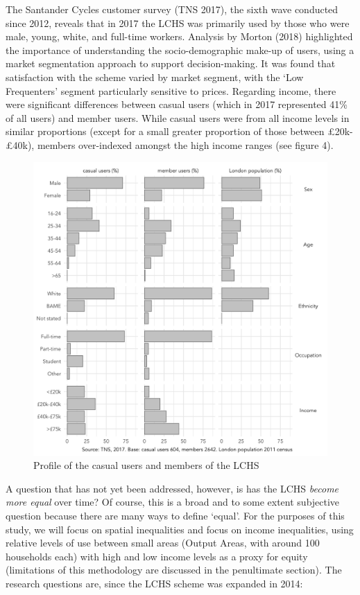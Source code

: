 \documentclass[]{article}
\begin{document}
The Santander Cycles customer survey (TNS 2017), the sixth wave conducted since 2012, reveals that in 2017 the LCHS was primarily used by those who were male, young, white, and full-time workers.
Analysis by Morton (2018) highlighted the importance of understanding the socio-demographic make-up of users, using a market segmentation approach to support decision-making.
It was found that satisfaction with the scheme varied by market segment, with the `Low Frequenters' segment particularly sensitive to prices.
Regarding income, there were significant differences between casual users (which in 2017 represented 41\% of all users) and member users. While casual users were from all income levels in similar proportions (except for a small greater proportion of those between £20k-£40k), members over-indexed amongst the high income ranges (see figure 4).

\begin{figure}

{\centering \includegraphics[width=0.7\linewidth]{figures/profile_users_lchs} 

}

\caption{Profile of the casual users and members of the LCHS}\label{fig:profile-users-lchs}
\end{figure}

A question that has not yet been addressed, however, is has the LCHS \emph{become more equal} over time?
Of course, this is a broad and to some extent subjective question because there are many ways to define `equal'.
For the purposes of this study, we will focus on spatial inequalities and focus on income inequalities, using relative levels of use between small areas (Output Areas, with around 100 households each) with high and low income levels as a proxy for equity (limitations of this methodology are discussed in the penultimate section).
The research questions are, since the LCHS scheme was expanded in 2014:
\end{document}
